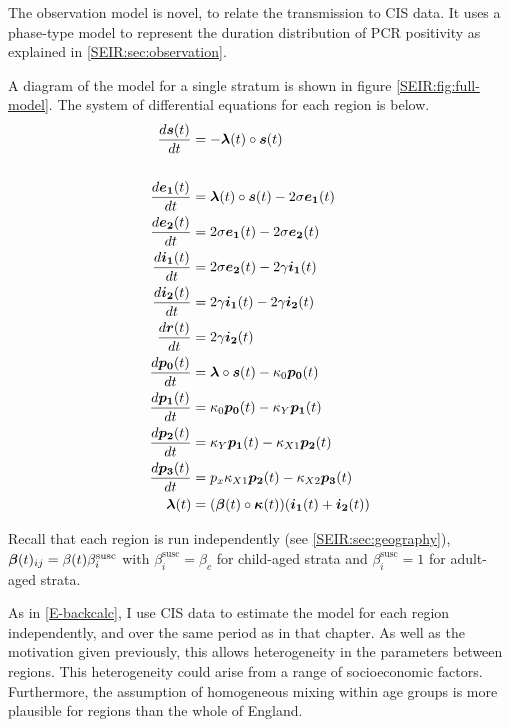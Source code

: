 \documentclass[thesis.tex]{subfiles}
\begin{document}
The observation model is novel, to relate the transmission to CIS data.
It uses a phase-type model to represent the duration distribution of PCR positivity as explained in \cref{SEIR:sec:observation}.

A diagram of the model for a single stratum is shown in figure \cref{SEIR:fig:full-model}.
The system of differential equations for each region is below.
\begin{align}
    \label{SEIR:eq:fullODEs}
    \frac{d\bm{s}(t)}{dt} &= -\bm{\lambda}(t) \circ \bm{s}(t) \\\\
    \frac{d\bm{e_1}(t)}{dt} &= \bm{\lambda}(t) \circ \bm{s}(t) - 2\sigma \bm{e_1}(t) \\
    \frac{d\bm{e_2}(t)}{dt} &= 2\sigma \bm{e_1}(t) - 2\sigma \bm{e_2}(t) \\
    \frac{d\bm{i_1}(t)}{dt} &= 2\sigma \bm{e_2}(t) - 2\gamma \bm{i_1}(t) \\
    \frac{d\bm{i_2}(t)}{dt} &= 2\gamma \bm{i_1}(t) - 2\gamma \bm{i_2}(t) \\
    \frac{d\bm{r}(t)}{dt} &= 2\gamma \bm{i_2}(t) \\
    \frac{d\bm{p_0}(t)}{dt} &= \bm{\lambda} \circ \bm{s}(t) - \kappa_0 \bm{p_0}(t) \\
    \frac{d\bm{p_1}(t)}{dt} &= \kappa_0 \bm{p_0}(t) - \kappa_Y \bm{p_1}(t) \\
    \frac{d\bm{p_2}(t)}{dt} &= \kappa_Y \bm{p_1}(t) - \kappa_{X1} \bm{p_2}(t) \\
    \frac{d\bm{p_3}(t)}{dt} &= p_x \kappa_{X1} \bm{p_2}(t) - \kappa_{X2} \bm{p_3}(t) \\
    \bm{\lambda}(t) &= (\bm{\beta}(t) \circ \bm{\kappa}(t)) (\bm{i_1}(t) + \bm{i_2}(t))
\end{align}

Recall that each region is run independently (see \cref{SEIR:sec:geography}), $\bm{\beta}(t)_{ij} = \beta(t) \beta^\text{susc}_i$ with $\beta^\text{susc}_i = \beta_c$ for child-aged strata and $\beta^\text{susc}_i = 1$ for adult-aged strata.

As in \cref{E-backcalc}, I use CIS data to estimate the model for each region independently, and over the same period as in that chapter.
As well as the motivation given previously, this allows heterogeneity in the parameters between regions.
This heterogeneity could arise from a range of socioeconomic factors.
Furthermore, the assumption of homogeneous mixing within age groups is more plausible for regions than the whole of England.
\end{document}
